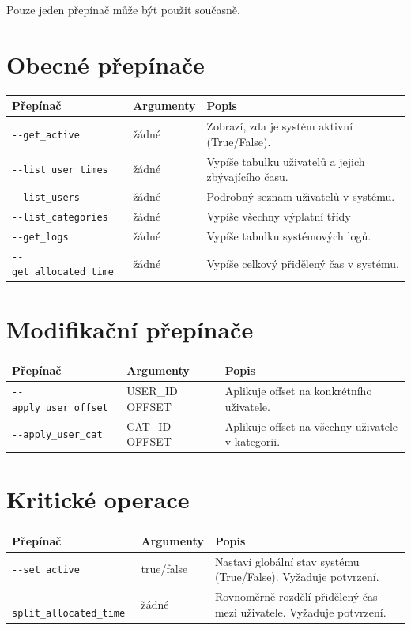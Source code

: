 \documentclass[11pt,a4paper]{book}
\begin{document}
Pouze jeden přepínač může být použit současně.

\section{Obecné přepínače}
\begin{longtable}{@{}llp{9cm}@{}}
\toprule
\textbf{Přepínač} & \textbf{Argumenty} & \textbf{Popis} \\
\midrule
\texttt{{-}-get\_active} & žádné & Zobrazí, zda je systém aktivní (True/False). \\
\texttt{{-}-list\_user\_times} & žádné & Vypíše tabulku uživatelů a jejich zbývajícího času. \\
\texttt{{-}-list\_users} & žádné & Podrobný seznam uživatelů v systému. \\
\texttt{{-}-list\_categories} & žádné & Vypíše všechny výplatní třídy \\
\texttt{{-}-get\_logs} & žádné & Vypíše tabulku systémových logů. \\
\texttt{{-}-get\_allocated\_time} & žádné & Vypíše celkový přidělený čas v systému. \\
\bottomrule
\end{longtable}

\section{Modifikační přepínače}
\begin{longtable}{@{}llp{9cm}@{}}
\toprule
\textbf{Přepínač} & \textbf{Argumenty} & \textbf{Popis} \\
\midrule
\texttt{{-}-apply\_user\_offset} & USER\_ID OFFSET & Aplikuje offset na konkrétního uživatele. \\
\texttt{{-}-apply\_user\_cat} & CAT\_ID OFFSET & Aplikuje offset na všechny uživatele v kategorii. \\
\bottomrule
\end{longtable}

\newpage

\section{Kritické operace}
\begin{longtable}{@{}llp{9cm}@{}}
\toprule
\textbf{Přepínač} & \textbf{Argumenty} & \textbf{Popis} \\
\midrule
\texttt{{-}-set\_active} & true/false & Nastaví globální stav systému (True/False). Vyžaduje potvrzení. \\
\texttt{{-}-split\_allocated\_time} & žádné & Rovnoměrně rozdělí přidělený čas mezi uživatele. Vyžaduje potvrzení. \\
\bottomrule
\end{longtable}
\end{document}
